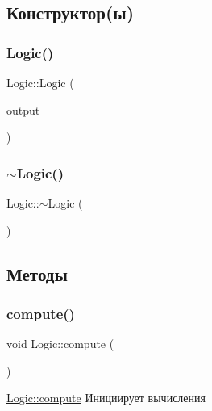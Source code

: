 \subsection{Конструктор(ы)}
\mbox{\label{class_logic_a9fb0198e941a32f25cb110875751f78e}} 
\subsubsection{\texorpdfstring{Logic()}{Logic()}}
{\footnotesize\ttfamily Logic\+::\+Logic (\begin{DoxyParamCaption}\item[{Q\+Plain\+Text\+Edit $\ast$}]{output }\end{DoxyParamCaption})}

\mbox{\label{class_logic_a406131db5b87e8d4b396aec37f3c1f69}} 
\subsubsection{\texorpdfstring{$\sim$\+Logic()}{~Logic()}}
{\footnotesize\ttfamily Logic\+::$\sim$\+Logic (\begin{DoxyParamCaption}{ }\end{DoxyParamCaption})}



\subsection{Методы}
\mbox{\label{class_logic_a17bd98c66121d7739f11af12affdb64b}} 
\subsubsection{\texorpdfstring{compute()}{compute()}}
{\footnotesize\ttfamily void Logic\+::compute (\begin{DoxyParamCaption}{ }\end{DoxyParamCaption})}



\hyperlink{class_logic_a17bd98c66121d7739f11af12affdb64b}{Logic\+::compute} Инициирует вычисления 

